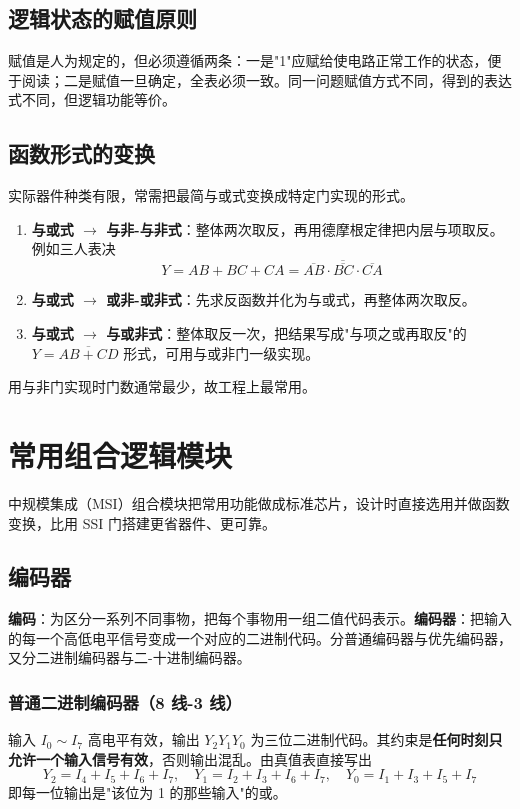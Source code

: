 \subsection{逻辑状态的赋值原则}
赋值是人为规定的，但必须遵循两条：一是"1"应赋给使电路正常工作的状态，便于阅读；二是赋值一旦确定，全表必须一致。同一问题赋值方式不同，得到的表达式不同，但逻辑功能等价。

\subsection{函数形式的变换}
实际器件种类有限，常需把最简与或式变换成特定门实现的形式。
\begin{enumerate}
    \item \textbf{与或式 \(\rightarrow\) 与非-与非式}：整体两次取反，再用德摩根定律把内层与项取反。例如三人表决
    \[
    Y=AB+BC+CA=\overline{\overline{AB}\cdot\overline{BC}\cdot\overline{CA}}
    \]
    \item \textbf{与或式 \(\rightarrow\) 或非-或非式}：先求反函数并化为与或式，再整体两次取反。
    \item \textbf{与或式 \(\rightarrow\) 与或非式}：整体取反一次，把结果写成"与项之或再取反"的 \(Y=\overline{AB+CD}\) 形式，可用与或非门一级实现。
\end{enumerate}
用与非门实现时门数通常最少，故工程上最常用。

\section{常用组合逻辑模块}
中规模集成（MSI）组合模块把常用功能做成标准芯片，设计时直接选用并做函数变换，比用 SSI 门搭建更省器件、更可靠。

\subsection{编码器}
\textbf{编码}：为区分一系列不同事物，把每个事物用一组二值代码表示。\textbf{编码器}：把输入的每一个高低电平信号变成一个对应的二进制代码。分普通编码器与优先编码器，又分二进制编码器与二-十进制编码器。

\subsubsection{普通二进制编码器（8 线-3 线）}
输入 \(I_0\sim I_7\) 高电平有效，输出 \(Y_2Y_1Y_0\) 为三位二进制代码。其约束是\textbf{任何时刻只允许一个输入信号有效}，否则输出混乱。由真值表直接写出
\[
Y_2=I_4+I_5+I_6+I_7,\quad
Y_1=I_2+I_3+I_6+I_7,\quad
Y_0=I_1+I_3+I_5+I_7
\]
即每一位输出是"该位为 1 的那些输入"的或。

